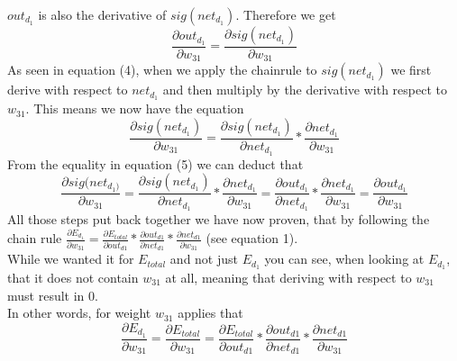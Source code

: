\documentclass[11pt, halfparskip]{article}
\begin{document}
$out_{d_1}$ is also the derivative of $sig(net_{d_1})$. Therefore we get
    \begin{equation}
	\frac{\partial out_{d_1}}{\partial w_{31}} = \frac{\partial sig(net_{d_1})}{\partial w_{31}}
    \end{equation}
As seen in equation (4), when we apply the chainrule to $sig(net_{d_1})$ we first derive with respect to $net_{d_1}$ and then multiply by the derivative with respect to $w_{31}$.
This means we now have the equation
    \begin{equation}
	\frac{\partial sig(net_{d_1})}{\partial w_{31}} = \frac{\partial sig(net_{d_1})}{\partial net_{d_1}}*\frac{\partial net_{d_1}}{\partial w_{31}}
    \end{equation}
From the equality in equation (5) we can deduct that
    \begin{equation}
    	\frac{\partial sig(net_{d_1)}}{\partial w_{31}} = \frac{\partial sig(net_{d_1})}{\partial net_{d_1}}*\frac{\partial net_{d_1}}{\partial w_{31}} = \frac{\partial out_{d_1}}{\partial 			net_{d_1}}*\frac{\partial net_{d_1}}{\partial w_{31}} = \frac{\partial out_{d_1}}{\partial w_{31}}
    \end{equation}
All those steps put back together we have now proven, that by following the chain rule $\frac{\partial E_{d_1}}{\partial w_{31}} = \frac{\partial E_{total}}{\partial out_{d1}} * \frac{\partial out_{d1}}{\partial net_{d1}} * \frac{\partial net_{d1}}{\partial w_{31}}$ (see equation 1).\\
While we wanted it for $E_{total}$ and not just $E_{d_1}$ you can see, when looking at $E_{d_1}$, that it does not contain $w_{31}$ at all, meaning that deriving with respect to $w_{31}$ must result in 0. \\
In other words, for weight $w_{31}$ applies that
    \begin{equation}
    	\frac{\partial E_{d_1}}{\partial w_{31}} = \frac{\partial E_{total}}{\partial w_{31}} = \frac{\partial E_{total}}{\partial out_{d1}} * \frac{\partial out_{d1}}{\partial net_{d1}} * 			\frac{\partial net_{d1}}{\partial w_{31}}
    \end{equation}
    
    
    
\end{document}
